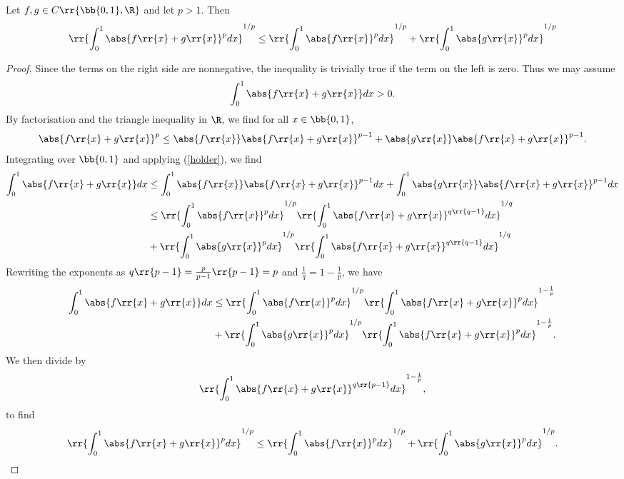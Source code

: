 \documentclass{article}
\begin{document}
\begin{claim*}[2b]
	Let $f,g\in C\rr{\bb{0,1},\R}$ and let $p>1$. Then
	\begin{align*}
		\rr{\int_{0}^{1} \abs{f\rr{x}+g\rr{x}}^p dx}^{1/p} \leq \rr{\int_{0}^{1} \abs{f\rr{x}}^p dx}^{1/p} + \rr{\int_{0}^{1} \abs{g\rr{x}}^p dx}^{1/p}
	\end{align*}
	\begin{proof}
		Since the terms on the right side are nonnegative, the inequality is trivially true if the term on the left is zero.
		Thus we may assume
		\begin{align*}
			\int_{0}^{1} \abs{f\rr{x}+g\rr{x}} dx > 0.
		\end{align*}
		By factorisation and the triangle inequality in $\R$, we find for all $x\in\bb{0,1}$,
		\begin{align*}
			\abs{f\rr{x}+g\rr{x}}^p\leq \abs{f\rr{x}}\abs{f\rr{x}+g\rr{x}}^{p-1} + \abs{g\rr{x}}\abs{f\rr{x}+g\rr{x}}^{p-1}.
		\end{align*}
		Integrating over $\bb{0,1}$ and applying (\ref{holder}), we find
		\begin{align*}
			\int_{0}^{1} \abs{f\rr{x}+g\rr{x}} dx & \leq \int_0^1 \abs{f\rr{x}}\abs{f\rr{x}+g\rr{x}}^{p-1} dx + \int_0^1 \abs{g\rr{x}}\abs{f\rr{x}+g\rr{x}}^{p-1} dx \\
			                                      & \leq \rr{\int_{0}^{1} \abs{f\rr{x}}^p dx}^{1/p} \rr{\int_{0}^{1} \abs{f\rr{x}+g\rr{x}}^{q\rr{q-1}} dx}^{1/q}     \\
			                                      & + \rr{\int_{0}^{1} \abs{g\rr{x}}^p dx}^{1/p} \rr{\int_{0}^{1} \abs{f\rr{x}+g\rr{x}}^{q\rr{q-1}} dx}^{1/q}
		\end{align*}
		Rewriting the exponents as $q\rr{p-1}=\frac{p}{p-1}\rr{p-1} = p$  and $\frac{1}{q}=1-\frac{1}{p}$, we have
		\begin{align*}
			\int_{0}^{1} \abs{f\rr{x}+g\rr{x}} dx & \leq \rr{\int_{0}^{1} \abs{f\rr{x}}^p dx}^{1/p} \rr{\int_{0}^{1} \abs{f\rr{x}+g\rr{x}}^{p} dx}^{1-\frac{1}{p}} \\
			                                      & + \rr{\int_{0}^{1} \abs{g\rr{x}}^p dx}^{1/p} \rr{\int_{0}^{1} \abs{f\rr{x}+g\rr{x}}^{p} dx}^{1-\frac{1}{p}}.
		\end{align*}
		We then divide by
		\begin{align*}
			\rr{\int_{0}^{1} \abs{f\rr{x} + g\rr{x}}^{q\rr{p-1}} dx}^{1-\frac{1}{p}},
		\end{align*}
		to find
		\begin{align*}
			\rr{\int_{0}^{1} \abs{f\rr{x}+g\rr{x}}^p dx}^{1/p} \leq \rr{\int_{0}^{1} \abs{f\rr{x}}^p dx}^{1/p} + \rr{\int_{0}^{1} \abs{g\rr{x}}^p dx}^{1/p}.
		\end{align*}
	\end{proof}
\end{claim*}
\end{document}
